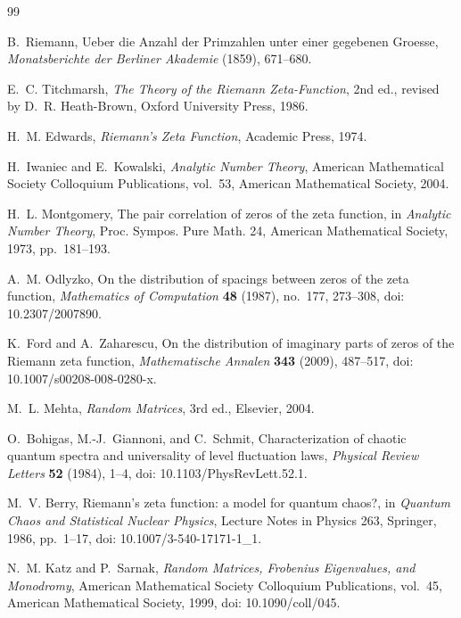 \documentclass[11pt]{amsart}
\numberwithin{equation}{section}
\theoremstyle{plain}
\theoremstyle{definition}
\theoremstyle{remark}
\begin{document}
\begin{thebibliography}{99}

B.~Riemann,
Ueber die Anzahl der Primzahlen unter einer gegebenen Groesse,
\emph{Monatsberichte der Berliner Akademie} (1859), 671--680.

E.~C. Titchmarsh,
\emph{The Theory of the Riemann Zeta-Function},
2nd ed., revised by D.~R. Heath-Brown,
Oxford University Press, 1986.

H.~M. Edwards,
\emph{Riemann's Zeta Function},
Academic Press, 1974.

H.~Iwaniec and E.~Kowalski,
\emph{Analytic Number Theory},
American Mathematical Society Colloquium Publications, vol.~53,
American Mathematical Society, 2004.

H.~L. Montgomery,
The pair correlation of zeros of the zeta function,
in \emph{Analytic Number Theory},
Proc. Sympos. Pure Math. 24,
American Mathematical Society, 1973, pp.~181--193.

A.~M. Odlyzko,
On the distribution of spacings between zeros of the zeta function,
\emph{Mathematics of Computation} \textbf{48} (1987), no.~177, 273--308,
doi: 10.2307/2007890.


K.~Ford and A.~Zaharescu,
On the distribution of imaginary parts of zeros of the Riemann zeta function,
\emph{Mathematische Annalen} \textbf{343} (2009), 487--517,
doi: 10.1007/s00208-008-0280-x.

M.~L. Mehta,
\emph{Random Matrices},
3rd ed., Elsevier, 2004.

O.~Bohigas, M.-J.~Giannoni, and C.~Schmit,
Characterization of chaotic quantum spectra and universality of level fluctuation laws,
\emph{Physical Review Letters} \textbf{52} (1984), 1--4,
doi: 10.1103/PhysRevLett.52.1.

M.~V. Berry,
Riemann's zeta function: a model for quantum chaos?,
in \emph{Quantum Chaos and Statistical Nuclear Physics},
Lecture Notes in Physics 263,
Springer, 1986, pp.~1--17,
doi: 10.1007/3-540-17171-1\_1.

N.~M. Katz and P.~Sarnak,
\emph{Random Matrices, Frobenius Eigenvalues, and Monodromy},
American Mathematical Society Colloquium Publications, vol.~45,
American Mathematical Society, 1999,
doi: 10.1090/coll/045.


\end{thebibliography}
\end{document}
